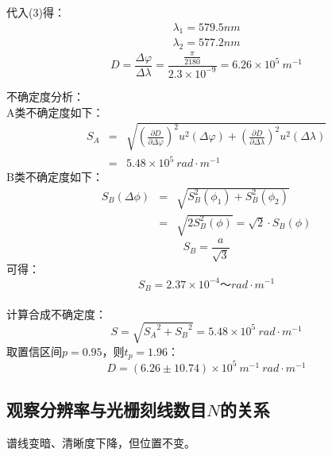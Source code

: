 \documentclass[a4paper,8pt,twocolumn]{article}
\begin{document}
  代入(3)得：
  \begin{eqnarray}
    \lambda_1 = 579.5 nm\\
    \lambda_2 = 577.2 nm
  \end{eqnarray}
  \begin{equation}
    D = \frac{\Delta\varphi}{\Delta\lambda} = \frac{\frac{\pi}{2180}}{2.3\times10^{-9}} = 6.26\times10^5~m^{-1}
  \end{equation}
  
  不确定度分析：\\
  A类不确定度如下：
  \begin{eqnarray}
    S_A & = & \sqrt{\left(\frac{\partial D}{\partial \Delta\varphi}\right)^2 u^2(\Delta\varphi) + \left(\frac{\partial D}{\partial \Delta\lambda}\right)^2 u^2(\Delta\lambda)} \\
    & = & 5.48 \times 10^{5}~rad \cdot m^{-1}
  \end{eqnarray}
  B类不确定度如下：
  \begin{eqnarray}
    S_B(\Delta \phi) &=& \sqrt{S_B^2(\phi_1) + S_B^2(\phi_2)}\\
     &=& \sqrt{2S_B^2(\phi)} = \sqrt{2} \cdot S_B(\phi)
  \end{eqnarray}
  \begin{equation}
      S_B = \frac{a}{\sqrt{3}}
  \end{equation}
  可得：\\
  \begin{equation}
    S_B = 2.37 \times 10^{-4}～rad \cdot m^{-1}
  \end{equation}\\
  计算合成不确定度：
  \begin{equation}
    S = \sqrt{{S_A}^2 + {S_B}^2} = 5.48 \times 10^{5}~rad \cdot m^{-1}
  \end{equation}
  取置信区间$p = 0.95$，则$t_p = 1.96$：
  \begin{equation}
    D = (6.26 \pm 10.74)\times10^5~m^{-1}~rad \cdot m^{-1}
  \end{equation}

 \subsection{观察分辨率与光栅刻线数目$N$的关系}
  谱线变暗、清晰度下降，但位置不变。
\end{document}
